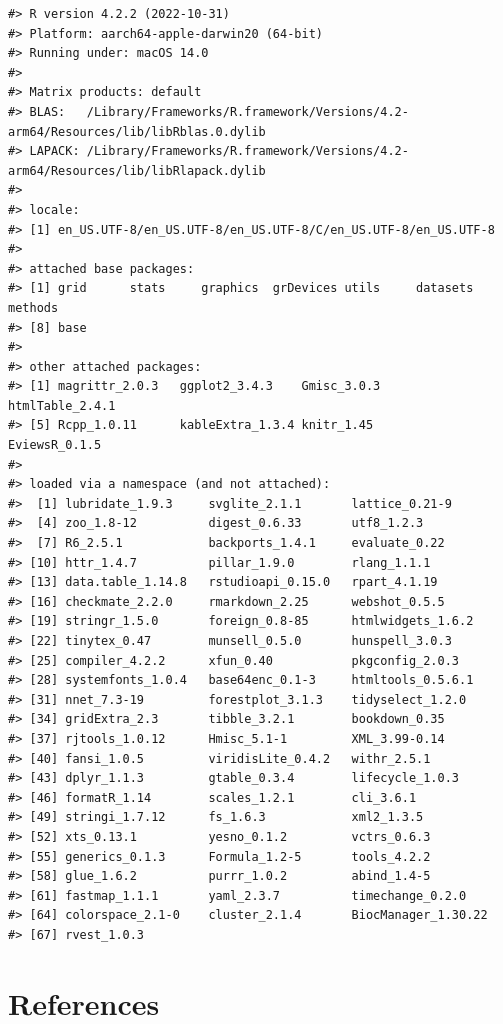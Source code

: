 \begin{verbatim}
#> R version 4.2.2 (2022-10-31)
#> Platform: aarch64-apple-darwin20 (64-bit)
#> Running under: macOS 14.0
#> 
#> Matrix products: default
#> BLAS:   /Library/Frameworks/R.framework/Versions/4.2-arm64/Resources/lib/libRblas.0.dylib
#> LAPACK: /Library/Frameworks/R.framework/Versions/4.2-arm64/Resources/lib/libRlapack.dylib
#> 
#> locale:
#> [1] en_US.UTF-8/en_US.UTF-8/en_US.UTF-8/C/en_US.UTF-8/en_US.UTF-8
#> 
#> attached base packages:
#> [1] grid      stats     graphics  grDevices utils     datasets  methods  
#> [8] base     
#> 
#> other attached packages:
#> [1] magrittr_2.0.3   ggplot2_3.4.3    Gmisc_3.0.3      htmlTable_2.4.1 
#> [5] Rcpp_1.0.11      kableExtra_1.3.4 knitr_1.45       EviewsR_0.1.5   
#> 
#> loaded via a namespace (and not attached):
#>  [1] lubridate_1.9.3     svglite_2.1.1       lattice_0.21-9     
#>  [4] zoo_1.8-12          digest_0.6.33       utf8_1.2.3         
#>  [7] R6_2.5.1            backports_1.4.1     evaluate_0.22      
#> [10] httr_1.4.7          pillar_1.9.0        rlang_1.1.1        
#> [13] data.table_1.14.8   rstudioapi_0.15.0   rpart_4.1.19       
#> [16] checkmate_2.2.0     rmarkdown_2.25      webshot_0.5.5      
#> [19] stringr_1.5.0       foreign_0.8-85      htmlwidgets_1.6.2  
#> [22] tinytex_0.47        munsell_0.5.0       hunspell_3.0.3     
#> [25] compiler_4.2.2      xfun_0.40           pkgconfig_2.0.3    
#> [28] systemfonts_1.0.4   base64enc_0.1-3     htmltools_0.5.6.1  
#> [31] nnet_7.3-19         forestplot_3.1.3    tidyselect_1.2.0   
#> [34] gridExtra_2.3       tibble_3.2.1        bookdown_0.35      
#> [37] rjtools_1.0.12      Hmisc_5.1-1         XML_3.99-0.14      
#> [40] fansi_1.0.5         viridisLite_0.4.2   withr_2.5.1        
#> [43] dplyr_1.1.3         gtable_0.3.4        lifecycle_1.0.3    
#> [46] formatR_1.14        scales_1.2.1        cli_3.6.1          
#> [49] stringi_1.7.12      fs_1.6.3            xml2_1.3.5         
#> [52] xts_0.13.1          yesno_0.1.2         vctrs_0.6.3        
#> [55] generics_0.1.3      Formula_1.2-5       tools_4.2.2        
#> [58] glue_1.6.2          purrr_1.0.2         abind_1.4-5        
#> [61] fastmap_1.1.1       yaml_2.3.7          timechange_0.2.0   
#> [64] colorspace_2.1-0    cluster_2.1.4       BiocManager_1.30.22
#> [67] rvest_1.0.3
\end{verbatim}

\hypertarget{references}{%
\section*{References}\label{references}}

